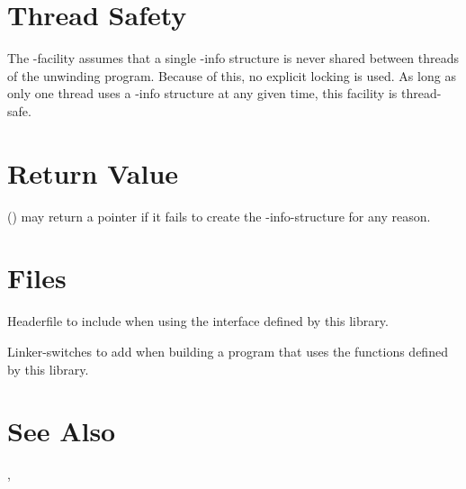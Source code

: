 \documentclass{article}
\begin{document}
\section{Thread Safety}

The -facility assumes that a single -info
structure is never shared between threads of the unwinding program.
Because of this,
no explicit locking is used.
As long as only one thread uses a -info structure at any given time,
this facility is thread-safe.

\section{Return Value}

() may return a  pointer if it fails
to create the -info-structure for any reason.

\section{Files}

\begin{Description}
\item[\File{libunwind-nto.h}] Headerfile to include when using the
  interface defined by this library.
\item[\Opt{-l}\File{unwind-nto} \Opt{-l}\File{unwind-generic}]
    Linker-switches to add when building a program that uses the
    functions defined by this library.
\end{Description}

\section{See Also}

,

\LatexManEnd
\end{document}

